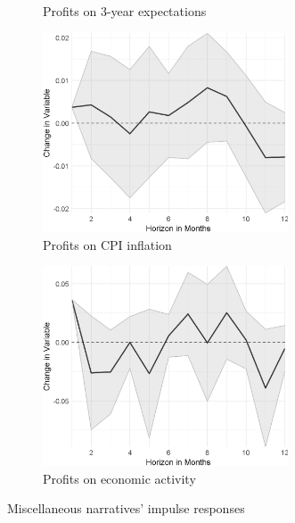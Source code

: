 \begin{figure}
\begin{subfigure}{00.24\textwidth}
		\caption{Profits on 3-year expectations}
	\end{subfigure}
	\begin{subfigure}{00.24\textwidth}
		\includegraphics[width=0.8\textwidth]{output/lp/baseline/bHP/profits/profitsoninflation_djn.eps}
		\caption{Profits on CPI inflation}
	\end{subfigure}
	\begin{subfigure}{00.24\textwidth}
		\includegraphics[width=0.8\textwidth]{output/lp/baseline/bHP/profits/profitsoneconac_djn.eps}
		\caption{Profits on economic activity}
	\end{subfigure}
	\caption{Miscellaneous narratives' impulse responses}
	\label{fig:irf_4}
\end{figure}
